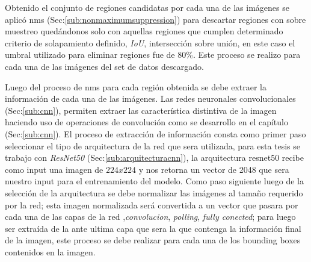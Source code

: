 Obtenido el conjunto de regiones candidatas por cada una de las imágenes se aplicó \ac{nms} (Sec:\ref{sub:nonmaximumsuppression}) para descartar regiones con sobre muestreo quedándonos solo con aquellas regiones que cumplen determinado criterio de solapamiento definido, \textit{IoU}, intersección sobre unión, en este caso el umbral utilizado para eliminar regiones fue de 80\%. Este proceso se realizo para cada una de las imágenes del set de datos descargado.


Luego del proceso de \ac{nms} para cada región obtenida se debe extraer la información de cada una de las imágenes. Las redes neuronales convolucionales (Sec:\ref{sub:cnn}), permiten extraer las característica distintiva de la imagen haciendo uso de operaciones de convolución como se desarrollo en el capítulo (Sec:\ref{sub:cnn}). El proceso de extracción de información consta como primer paso seleccionar el tipo de arquitectura de la red que sera utilizada, para esta tesis se trabajo con \textit{ResNet50} (Sec:\ref{sub:arquitecturacnn}), la arquitectura  resnet50 recibe como input una imagen de $224 x 224$ y nos retorna un vector de 2048 que sera nuestro input para el entrenamiento del modelo.
Como paso siguiente luego de la selección de la arquitectura se debe normalizar las imágenes al tamaño requerido por la red; esta imagen normalizada será convertida a un vector que pasara por cada una de las capas de la red ,\textit{convolucion}, \textit{polling}, \textit{fully conected}; para luego ser extraída de la ante ultima capa que sera la que contenga la información final de la imagen, este proceso se debe realizar para cada una de los bounding boxes contenidos en la imagen.





